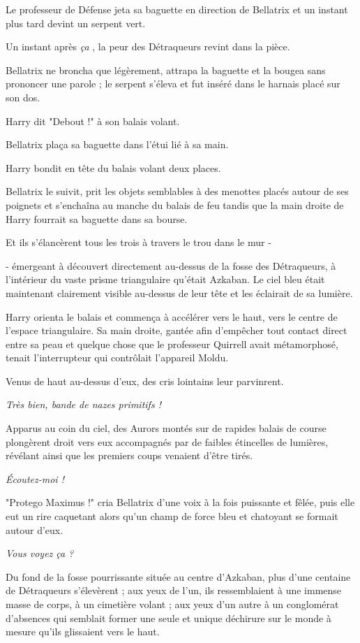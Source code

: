 Le professeur de Défense jeta sa baguette en direction de Bellatrix et un instant plus tard devint un serpent vert.

Un instant après \emph{ça} , la peur des Détraqueurs revint dans la pièce.

Bellatrix ne broncha que légèrement, attrapa la baguette et la bougea sans prononcer une parole ; le serpent s'éleva et fut inséré dans le harnais placé sur son dos.

Harry dit "Debout !" à son balais volant.

Bellatrix plaça sa baguette dans l'étui lié à sa main.

Harry bondit en tête du balais volant deux places.

Bellatrix le suivit, prit les objets semblables à des menottes placés autour de ses poignets et s'enchaîna au manche du balais de feu tandis que la main droite de Harry fourrait sa baguette dans sa bourse.

Et ils s'élancèrent tous les trois à travers le trou dans le mur -

- émergeant à découvert directement au-dessus de la fosse des Détraqueurs, à l'intérieur du vaste prisme triangulaire qu'était Azkaban. Le ciel bleu était maintenant clairement visible au-dessus de leur tête et les éclairait de sa lumière.

Harry orienta le balais et commença à accélérer vers le haut, vers le centre de l'espace triangulaire. Sa main droite, gantée afin d'empêcher tout contact direct entre sa peau et quelque chose que le professeur Quirrell avait métamorphosé, tenait l'interrupteur qui contrôlait l'appareil Moldu.

Venus de haut au-dessus d'eux, des cris lointains leur parvinrent.

\emph{Très bien, bande de nazes primitifs !} 

Apparus au coin du ciel, des Aurors montés sur de rapides balais de course plongèrent droit vers eux accompagnés par de faibles étincelles de lumières, révélant ainsi que les premiers coups venaient d'être tirés.

\emph{Écoutez-moi !} 

"Protego Maximus !" cria Bellatrix d'une voix à la fois puissante et fêlée, puis elle eut un rire caquetant alors qu'un champ de force bleu et chatoyant se formait autour d'eux.

\emph{Vous voyez ça ?} 

Du fond de la fosse pourrissante située au centre d'Azkaban, plus d'une centaine de Détraqueurs s'élevèrent ; aux yeux de l'un, ils ressemblaient à une immense masse de corps, à un cimetière volant ; aux yeux d'un autre à un conglomérat d'absences qui semblait former une seule et unique déchirure sur le monde à mesure qu'ils glissaient vers le haut.

